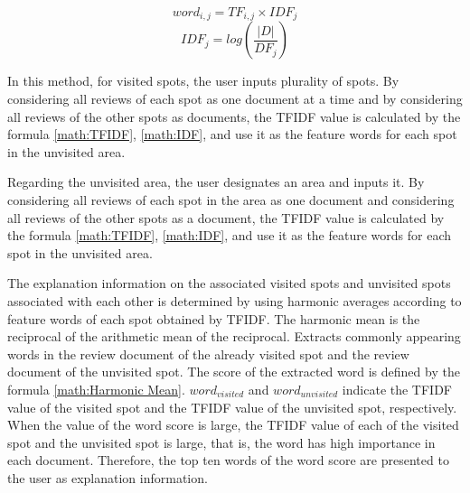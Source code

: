 \documentclass[journal]{IAENGtran}
\begin{document}
\begin{equation}
  word_{i,j} = TF_{i,j} \times IDF_{j}
  \label{math:TFIDF}
\end{equation}
\begin{equation}
  IDF_{j} = log(\frac{|D|}{DF_{j}})
  \label{math:IDF}
\end{equation}

In this method, for visited spots, the user inputs plurality of spots.
By considering all reviews of each spot as one document at a time and by considering all reviews of the other spots as documents, the TFIDF value is calculated by the formula \ref{math:TFIDF}, \ref{math:IDF}, and use it as the feature words for each spot in the unvisited area.

Regarding the unvisited area, the user designates an area and inputs it.
By considering all reviews of each spot in the area as one document and considering all reviews of the other spots as a document, the TFIDF value is calculated by the formula \ref{math:TFIDF}, \ref{math:IDF}, and use it as the feature words for each spot in the unvisited area.

The explanation information on the associated visited spots and unvisited spots associated with each other is determined by using harmonic averages according to feature words of each spot obtained by TFIDF.
The harmonic mean is the reciprocal of the arithmetic mean of the reciprocal.
Extracts commonly appearing words in the review document of the already visited spot and the review document of the unvisited spot.
The score of the extracted word is defined by the formula \ref{math:Harmonic Mean}.
$word_{visited}$ and $word_{unvisited}$ indicate the TFIDF value of the visited spot and the TFIDF value of the unvisited spot, respectively.
When the value of the word score is large, the TFIDF value of each of the visited spot and the unvisited spot is large, that is, the word has high importance in each document.
Therefore, the top ten words of the word score are presented to the user as explanation information.
\end{document}
